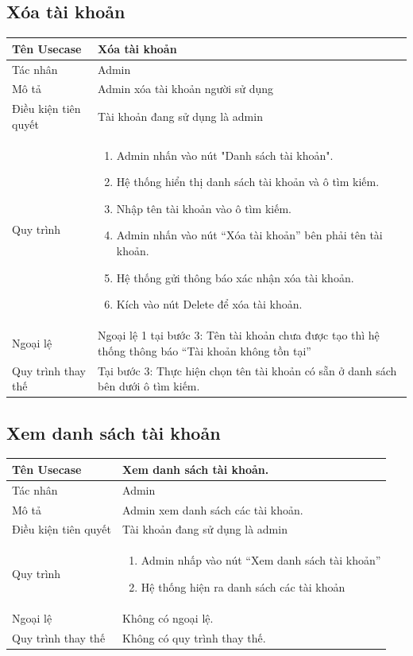 \subsection{Xóa tài khoản}
\begin{center}
	\begin{tabular}{|p{4cm}|p{10cm}|}
		\hline
		Tên Usecase & Xóa tài khoản\\ \hline
		Tác nhân & Admin\\ \hline
		Mô tả & Admin xóa tài khoản người sử dụng
		\\ \hline
		Điều kiện tiên quyết & Tài khoản đang sử dụng là admin \\ \hline
		Quy trình & \begin{enumerate}
			\item Admin nhấn vào nút "Danh sách tài khoản".
			\item Hệ thống hiển thị danh sách tài khoản và ô tìm kiếm.
			\item Nhập tên tài khoản vào ô tìm kiếm.
			\item Admin nhấn vào nút “Xóa tài khoản” bên phải tên tài khoản.
			\item Hệ thống gửi thông báo xác nhận xóa tài khoản.
			\item Kích vào nút Delete để xóa tài khoản.
		\end{enumerate}\\ \hline
		Ngoại lệ & Ngoại lệ 1 tại bước 3: Tên tài khoản chưa được tạo thì hệ thống thông báo “Tài khoản không tồn tại”
		\\ \hline
		Quy trình thay thế &
		Tại bước 3: Thực hiện chọn tên tài khoản có sẵn ở danh sách bên dưới ô tìm kiếm.
		\\ \hline
		
	\end{tabular}
\end{center}
\subsection{Xem danh sách tài khoản}
\begin{center}
	\begin{tabular}{|p{4cm}|p{10cm}|}
		\hline
		Tên Usecase & Xem danh sách tài khoản.\\ \hline
		Tác nhân & Admin\\ \hline
		Mô tả & Admin xem danh sách các tài khoản.
		\\ \hline
		Điều kiện tiên quyết & Tài khoản đang sử dụng là admin \\ \hline
		Quy trình & \begin{enumerate}
			\item  Admin nhấp vào nút “Xem danh sách tài khoản”
			\item Hệ thống hiện ra danh sách các tài khoản
			
		\end{enumerate}\\ \hline
		Ngoại lệ & Không có ngoại lệ.\\ \hline
		Quy trình thay thế & Không có quy trình thay thế. \\ \hline
		
	\end{tabular}
\end{center}
